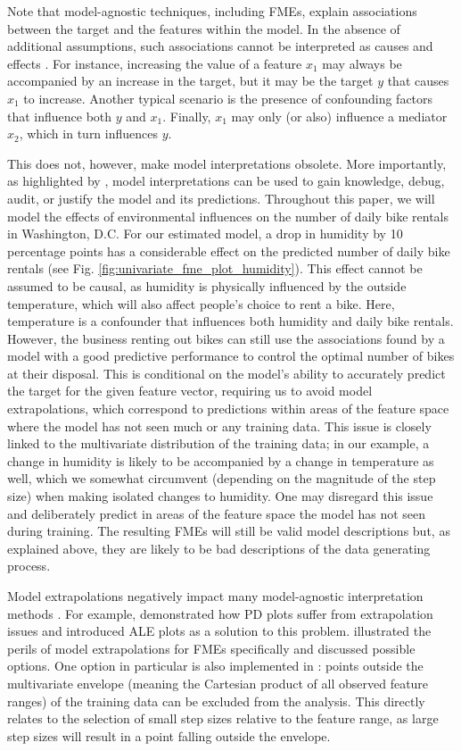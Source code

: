 Note that model-agnostic techniques, including FMEs, explain associations between the target and the features within the model. In the absence of additional assumptions, such associations cannot be interpreted as causes and effects \citep{molnar_pitfalls}. For instance, increasing the value of a feature $x_1$ may always be accompanied by an increase in the target, but it may be the target $y$ that causes $x_1$ to increase. Another typical scenario is the presence of confounding factors that influence both $y$ and $x_1$. Finally, $x_1$ may only (or also) influence a mediator $x_2$, which in turn influences $y$.
\par
This does not, however, make model interpretations obsolete. More importantly, as highlighted by \cite{Adadi}, model interpretations can be used to gain knowledge, debug, audit, or justify the model and its predictions. Throughout this paper, we will model the effects of environmental influences on the number of daily bike rentals in Washington, D.C. For our estimated model, a drop in humidity by 10 percentage points has a considerable effect on the predicted number of daily bike rentals (see Fig. \ref{fig:univariate_fme_plot_humidity}). This effect cannot be assumed to be causal, as humidity is physically influenced by the outside temperature, which will also affect people's choice to rent a bike. Here, temperature is a confounder that influences both humidity and daily bike rentals. However, the business renting out bikes can still use the associations found by a model with a good predictive performance to control the optimal number of bikes at their disposal. This is conditional on the model's ability to accurately predict the target for the given feature vector, requiring us to avoid model extrapolations, which correspond to predictions within areas of the feature space where the model has not seen much or any training data. This issue is closely linked to the multivariate distribution of the training data; in our example, a change in humidity is likely to be accompanied by a change in temperature as well, which we somewhat circumvent (depending on the magnitude of the step size) when making isolated changes to humidity. One may disregard this issue and deliberately predict in areas of the feature space the model has not seen during training. The resulting FMEs will still be valid model descriptions but, as explained above, they are likely to be bad descriptions of the data generating process.
\par
Model extrapolations negatively impact many model-agnostic interpretation methods \citep{hooker_fanova, hooker_cert, hooker_generalizedfanova, hooker_importance, molnar_pitfalls}. For example, \cite{apley_ale} demonstrated how PD plots suffer from extrapolation issues and introduced ALE plots as a solution to this problem. \citet{scholbeck_fme} illustrated the perils of model extrapolations for FMEs specifically and discussed possible options. One option in particular is also implemented in : points outside the multivariate envelope (meaning the Cartesian product of all observed feature ranges) of the training data can be excluded from the analysis. This directly relates to the selection of small step sizes relative to the feature range, as large step sizes will result in a point falling outside the envelope.
